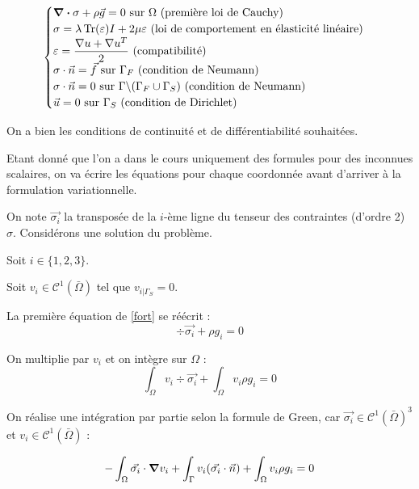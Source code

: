 \begin{equation}\label{fort}
    \begin{cases}
      \div \sigma + \rho \vec{g} = 0 \textrm { sur $\Omega$ (première loi de Cauchy)} \\
      \sigma = \lambda \operatorname{Tr} (\varepsilon) I + 2 \mu \varepsilon \textrm { (loi de comportement en élasticité linéaire)} \\
      \varepsilon=\dfrac{\nabla u + \nabla u^T }{2} \textrm { (compatibilité)} \\
      \sigma \cdot \vec{n} = \vec{f}\textrm { sur $\Gamma_F$ (condition de Neumann)} \\
      \sigma \cdot \vec{n} = 0\textrm { sur $\Gamma \backslash (\Gamma_F \cup \Gamma_S) $ (condition de Neumann)} \\
      \vec{u} = 0 \textrm { sur $\Gamma_S$ (condition de Dirichlet)} \\
      
    \end{cases}
\end{equation}

On a bien les conditions de continuité et de différentiabilité souhaitées. 

Etant donné que l'on a dans le cours uniquement des formules pour des inconnues scalaires, on va écrire les équations pour chaque coordonnée avant d'arriver à la formulation variationnelle.

On note $\vec{\sigma_i}$ la transposée de la $i$-ème ligne du tenseur des contraintes (d'ordre 2) $\sigma$. Considérons une solution du problème.

Soit $i \in \{1,2,3\}$.

Soit $v_i \in \mathcal{C}^1(\bar{\Omega})$ tel que $v_{i|\Gamma_S} = 0$.



La première équation de \eqref{fort} se réécrit :
$$\div \vec{\sigma_i} + \rho g_i = 0$$

On multiplie par $v_i$ et on intègre sur $\Omega$ :
$$\int_\Omega v_i \div \vec{\sigma_i} +  \int_\Omega v_i \rho g_i = 0$$

On réalise une intégration par partie selon la formule de Green, car $\vec{\sigma_i} \in \mathcal{C}^1(\bar{\Omega})^3$ et $v_i \in \mathcal{C}^1(\bar{\Omega})$ :


\begin{equation}\label{green}
    -\int_{\Omega} \vec{\sigma_i} \cdot \grad v_i + \int_{\Gamma} v_i (\vec{\sigma_i} \cdot \vec{n}) + \int_\Omega v_i \rho g_i = 0
\end{equation}

